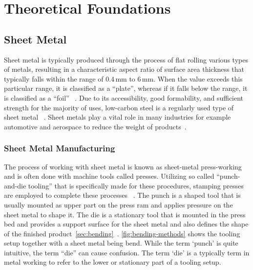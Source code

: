 \chapter{Theoretical Foundations}\label{ch:theoretical-foundations}


\section{Sheet Metal}\label{sec:sheet-metal}
Sheet metal is typically produced through the process of flat rolling various types of metals, resulting in a
characteristic aspect ratio of surface area thickness that typically falls within the range of
0.4\,mm to 6\,mm.
When the value exceeds this particular range, it is classified as a ``plate'', whereas if it falls below the range,
it is classified as a ``foil''
~\cite[p. 405]{groover_fundamentalsmodernmanufacturing_2020}.
Due to its accessibility, good formability, and sufficient strength for the majority of uses, low-carbon steel is a
regularly used type of sheet metal
~\cite[p. 405]{groover_fundamentalsmodernmanufacturing_2020}.
Sheet metals play a vital role in many industries for example automotive and aerospace to reduce the weight of
products~\cite[p. 1]{zheng_reviewformingtechniques_2018}.

\subsection{Sheet Metal Manufacturing}\label{subsec:sheet-metal-manufacturing}
The process of working with sheet metal is known as sheet-metal press-working and is often done with machine tools
called presses.
Utilizing so called ``punch-and-die tooling'' that is specifically made for these procedures, stamping presses are
employed to complete these processes
~\cite[p. 405]{groover_fundamentalsmodernmanufacturing_2020}.
The punch is a shaped tool that is usually mounted as upper part on the press ram and applies
pressure on the sheet metal to shape it.
The die is a stationary tool that is mounted in the press bed and provides a support surface for
the sheet metal and also defines the shape of the finished
product~\cref{sec:bending}~\cite[p. 412]{groover_fundamentalsmodernmanufacturing_2020}.
\cref{fig:bending-methods} shows the tooling setup together with a sheet metal being bend.
While the term `punch' is quite intuitive, the term ``die'' can cause confusion.
The term `die' is a typically term in metal working to refer to the lower or stationary part of a tooling setup.

